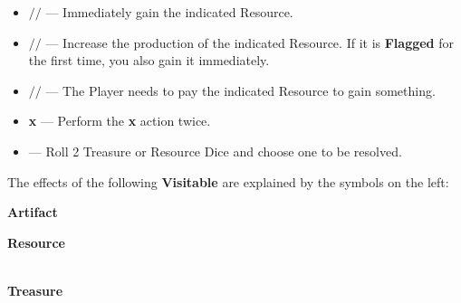 \begin{multicols*}{2}
\medskip

\begin{itemize}[itemsep=0.4em]
  \item [{\LARGE$\boldsymbol{+}$}]
    $\boldsymbol{/}$$\boldsymbol{/}$ —
    Immediately gain the indicated Resource.
  \item [{\svg[14]{ongoing}}]
    $\boldsymbol{/}$$\boldsymbol{/}$ —
    Increase the production of the indicated Resource.
    If it is \textbf{Flagged} for the first time, you also gain it immediately.
  \item [{\svg[10]{pay_v2}}]
    $\boldsymbol{/}$$\boldsymbol{/}$  —
    The Player needs to pay the indicated Resource to gain something.
  \item [{\LARGE\textbf{2}}] {\LARGE\textbf{x}} —
    Perform the {\LARGE\textbf{x}} action twice.
  \item [{\LARGE\textbf{2}}]    —
    Roll 2 Treasure or Resource Dice and choose one to be resolved.
\end{itemize}

\columnbreak


The effects of the following \textbf{Visitable}  are explained by the symbols on the left:

\medskip

{\centering
  \phantom{j}\textbf{Artifact}\\

  \bigskip

  \phantom{j}\textbf{Resource}\\
  \\

  \bigskip

  \phantom{j}\textbf{Treasure}\\
  \\
}
\end{multicols*}

